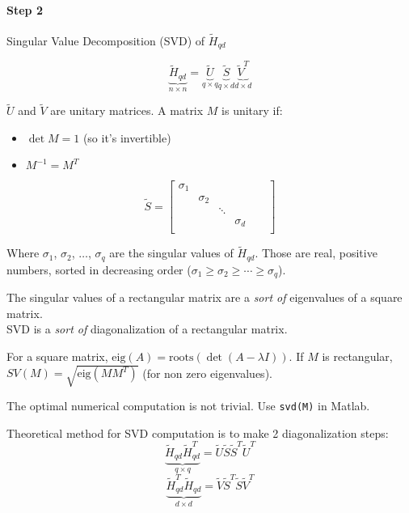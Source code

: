 
\paragraph{Step 2} Singular Value Decomposition (SVD) of $\tilde{H}_{qd}$

\[
    \underbrace{\tilde{H}_{qd}}_{n\times n} = \underbrace{\tilde{U}}_{q\times q} \underbrace{\tilde{S}}_{q\times d} \underbrace{\tilde{V}^T}_{d\times d}
\]

$\tilde{U}$ and $\tilde{V}$ are unitary matrices. A matrix $M$ is unitary if:
\begin{itemize}
    \item $\det M = 1$ (so it's invertible)
    \item $M^{-1} = M^T$
\end{itemize}

\[
    \tilde{S} = \begin{bmatrix}
        \sigma_1 & & & & &\\
        & \sigma_2 & & & &\\
        & & \ddots & & &\\
        & &  & \sigma_d & &\\
    \end{bmatrix}
\]

Where $\sigma_1$, $\sigma_2$, $\ldots$, $\sigma_q$ are the singular values of $\tilde{H}_{qd}$.
Those are real, positive numbers, sorted in decreasing order ($\sigma_1 \ge \sigma_2 \ge \cdots \ge \sigma_q$).

\begin{remark}
    The singular values of a rectangular matrix are a \emph{sort of} eigenvalues of a square matrix.\\
    SVD is a \emph{sort of} diagonalization of a rectangular matrix.
\end{remark}

\begin{remark}
    For a square matrix, $\text{eig}(A) = \text{roots}(\det(A-\lambda I))$. If $M$ is rectangular, $SV(M) = \sqrt{\text{eig}(MM^T)}$ (for non zero eigenvalues).
\end{remark}

\begin{remark}
    The optimal numerical computation is not trivial. Use \texttt{svd(M)} in Matlab.

    Theoretical method for SVD computation is to make 2 diagonalization steps:
    \[
        \underbrace{\tilde{H}_{qd} \tilde{H}_{qd}^T}_{q\times q} = \tilde{U}\tilde{S}\tilde{S}^T\tilde{U}^T
    \]
    \[
        \underbrace{\tilde{H}_{qd}^T \tilde{H}_{qd}}_{d\times d} = \tilde{V}\tilde{S}^T\tilde{S}\tilde{V}^T
    \]
\end{remark}

